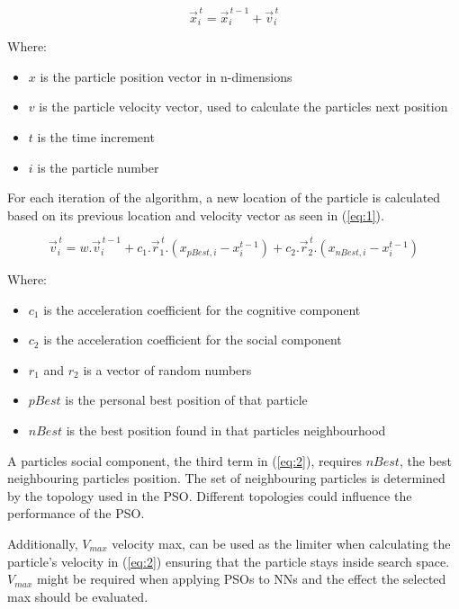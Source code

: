 \documentclass[conference]{IEEEtran}
\begin{document}
	\begin{equation} \label{eq:1}
	\vec{x}_{i}^{\,t} = \vec{x}_{i}^{\,t-1} + \vec{v}_{i}^{\,t}
	\end{equation}

	\noindent Where:
	\begin{itemize}
		\item $x$ is the particle position vector in n-dimensions
		\item $v$ is the particle velocity vector, used to calculate the particles next position
		\item $t$ is the time increment
		\item $i$ is the particle number
	\end{itemize}
	\vspace{5mm}
	\noindent For each iteration of the algorithm, a new location of the particle is calculated based on its previous location and velocity vector as seen in (\ref{eq:1}).

	\begin{equation} \label{eq:2}
	\vec{v}_{i}^{\,t} = w . \vec{v}_{i}^{\,t-1} + c_1 . \vec{r}_{1}^{\,t} . (x_{pBest, i} - x_{i}^{t-1}) + c_2 . \vec{r}_{2}^{\,t} . (x_{nBest, i} - x_{i}^{t-1})
	\end{equation}

	\noindent Where:
	\begin{itemize}
		\item $c_1$ is the acceleration coefficient for the cognitive component
		\item $c_2$ is the acceleration coefficient for the social component
		\item $r_1$ and $r_2$ is a vector of random numbers
		\item $pBest$ is the personal best position of that particle
		\item $nBest$ is the best position found in that particles neighbourhood
	\end{itemize}
	\vspace{5mm}
	\noindent A particles social component, the third term in (\ref{eq:2}), requires $nBest$, the best neighbouring particles position. The set of neighbouring particles is determined by the topology used in the \ac{PSO}. Different topologies could influence the performance of the \ac{PSO}.

	Additionally, $ V_{max} $ velocity max, can be used as the limiter when calculating the particle's velocity in (\ref{eq:2}) ensuring that the particle stays inside search space. $ V_{max} $ might be required when applying \ac{PSO}s to \ac{NN}s and the effect the selected max should be evaluated.
\end{document}
